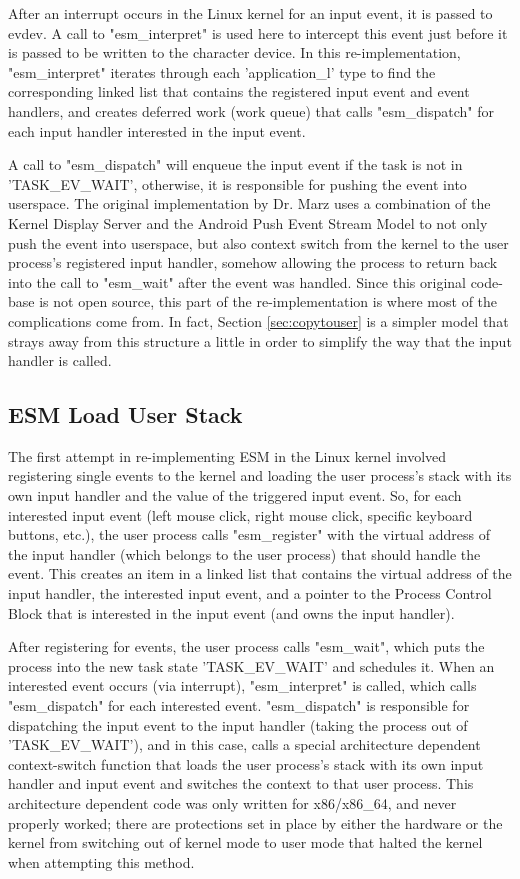 \documentclass[10pt,journal,compsoc]{IEEEtran}
\begin{document}
After an interrupt occurs in the Linux kernel for an input event, it is passed to evdev. A call to "esm\_interpret" is used here to intercept this event just before it is passed to be written to the character device. In this re-implementation, "esm\_interpret" iterates through each 'application\_l' type to find the corresponding linked list that contains the registered input event and event handlers, and creates deferred work (work queue) that calls "esm\_dispatch" for each input handler interested in the input event.

A call to "esm\_dispatch" will enqueue the input event if the task is not in 'TASK\_EV\_WAIT', otherwise, it is responsible for pushing the event into userspace. The original implementation by Dr. Marz uses a combination of the Kernel Display Server and the Android Push Event Stream Model to not only push the event into userspace, but also context switch from the kernel to the user process's registered input handler, somehow allowing the process to return back into the call to "esm\_wait" after the event was handled. Since this original code-base is not open source, this part of the re-implementation is where most of the complications come from. In fact, Section \ref{sec:copytouser} is a simpler model that strays away from this structure a little in order to simplify the way that the input handler is called.

\subsection{ESM Load User Stack}
\label{sec:userstack}
The first attempt in re-implementing ESM in the Linux kernel involved registering single events to the kernel and loading the user process's stack with its own input handler and the value of the triggered input event. So, for each interested input event (left mouse click, right mouse click, specific keyboard buttons, etc.), the user process calls "esm\_register" with the virtual address of the input handler (which belongs to the user process) that should handle the event. This creates an item in a linked list that contains the virtual address of the input handler, the interested input event, and a pointer to the Process Control Block that is interested in the input event (and owns the input handler).

After registering for events, the user process calls "esm\_wait", which puts the process into the new task state 'TASK\_EV\_WAIT' and schedules it. When an interested event occurs (via interrupt), "esm\_interpret" is called, which calls "esm\_dispatch" for each interested event. "esm\_dispatch" is responsible for dispatching the input event to the input handler (taking the process out of 'TASK\_EV\_WAIT'), and in this case, calls a special architecture dependent context-switch function that loads the user process's stack with its own input handler and input event and switches the context to that user process. This architecture dependent code was only written for x86/x86\_64, and never properly worked; there are protections set in place by either the hardware or the kernel from switching out of kernel mode to user mode that halted the kernel when attempting this method.
\end{document}
